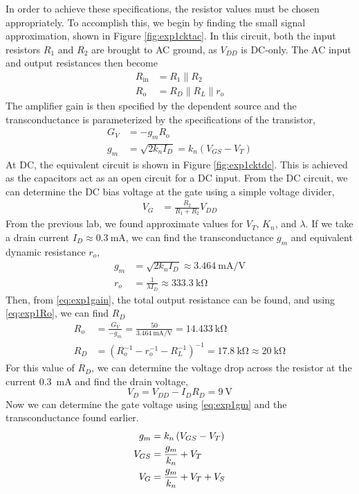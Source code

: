 \documentclass{report}
\begin{document}
In order to achieve these specifications, the resistor values must be chosen appropriately. To accomplish this, we begin by finding the small signal approximation, shown in Figure \ref{fig:exp1cktac}. In this circuit, both the input resistors $R_1$ and $R_2$ are brought to AC ground, as $V_{DD}$ is DC-only. The AC input and output resistances then become \begin{align}
	R_\mathrm{in} & = R_1 \parallel R_2 \\
	R_\mathrm{o} & = R_D \parallel R_L \parallel r_o \label{eq:exp1Ro}
\end{align}
The amplifier gain is then specified by the dependent source and the transconductance is parameterized by the specifications of the transistor, \begin{align}
	G_V & = -g_m R_\mathrm{o} \label{eq:exp1gain} \\
	g_m & = \sqrt{2 k_n I_D } = k_n \left(V_{GS} - V_T\right) \label{eq:exp1gm}
\end{align}
At DC, the equivalent circuit is shown in Figure \ref{fig:exp1cktdc}. This is achieved as the capacitors act as an open circuit for a DC input. From the DC circuit, we can determine the DC bias voltage at the gate using a simple voltage divider, \begin{align}
	V_G & = \frac{R_2}{R_1 + R_2} V_{DD} \label{eq:exp1vg}
\end{align}
From the previous lab, we found approximate values for $V_T$, $K_n$, and $\lambda$. If we take a drain current $I_D \approx \SI{0.3}{\mA}$, we can find the transconductance $g_m$ and equivalent dynamic resistance $r_o$,
\begin{align*}
	g_m & = \sqrt{2 k_n I_D} \approx \SI{3.464}{\mA/\V} \\
	r_o & = \frac{1}{\lambda I_D} \approx \SI{333.3}{\kohm}
\end{align*}
Then, from \eqref{eq:exp1gain}, the total output resistance can be found, and using \eqref{eq:exp1Ro}, we can find $R_D$ \begin{align*}
	R_o & = \frac{G_V}{-g_m} = \frac{50}{\SI{3.464}{\mA/\V}} = \SI{14.433}{\kohm} \\
	R_D & =  \left(R_o^{-1} - r_o^{-1} - R_L^{-1}\right)^{-1} = \SI{17.8}{\kohm} \approx \SI{20}{\kohm}
\end{align*}
For this value of $R_D$, we can determine the voltage drop across the resistor at the current \SI{0.3}{\mA} and find the drain voltage,
\[ V_D = V_{DD} - I_D R_D = \SI{9}{\V}\]
Now we can determine the gate voltage using \eqref{eq:exp1gm} and the transconductance found earlier. \begin{align}
	g_m & = k_n \left(V_{GS} - V_T\right) \notag \\
	V_{GS} & = \frac{g_m}{k_n} + V_T \notag \\
	V_G & = \frac{g_m}{k_n} + V_T + V_S
\end{align}
\end{document}
